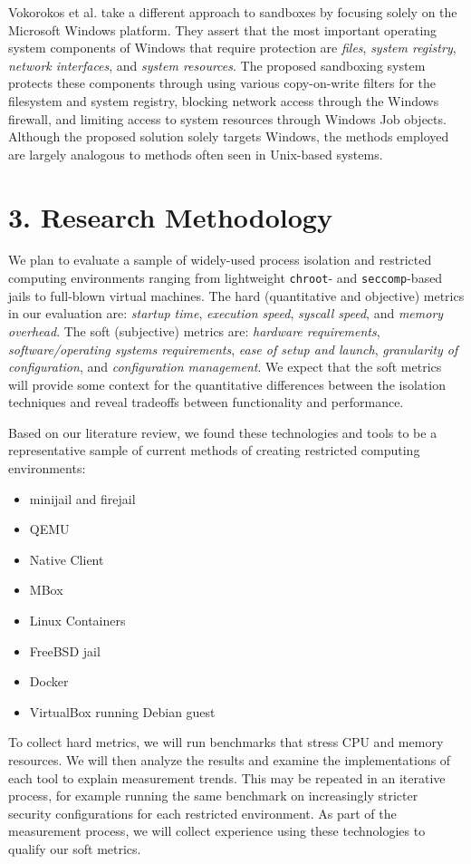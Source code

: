 \documentclass{proc}
\begin{document}
Vokorokos et al. \cite{vokorokos2015sandboxMSWIN} take a different approach to sandboxes by focusing solely on the Microsoft Windows platform. They assert that the most important operating system components of Windows that require protection are \textit{files}, \textit{system registry}, \textit{network interfaces}, and \textit{system resources}. The proposed sandboxing system protects these components through using various copy-on-write filters for the filesystem and system registry, blocking network access through the Windows firewall, and limiting access to system resources through Windows Job objects. Although the proposed solution solely targets Windows, the methods employed are largely analogous to methods often seen in Unix-based systems.

\section*{3. Research Methodology}
We plan to evaluate a sample of widely-used process isolation and restricted computing environments ranging from lightweight \texttt{chroot}- and \texttt{seccomp}-based jails to full-blown virtual machines. The hard (quantitative and objective) metrics in our evaluation are: \textit{startup time}, \textit{execution speed}, \textit{syscall speed}, and \textit{memory overhead}. The soft (subjective) metrics are: \textit{hardware requirements}, \textit{software/operating systems requirements}, \textit{ease of setup and launch}, \textit{granularity of configuration}, and \textit{configuration management}. We expect that the soft metrics will provide some context for the quantitative differences between the isolation techniques and reveal tradeoffs between functionality and performance.

Based on our literature review, we found these technologies and tools to be a representative sample of current methods of creating restricted computing environments:\vspace{0.5em}
{\small
\begin{itemize}
\item minijail and firejail
\item QEMU
\item Native Client
\item MBox
\item Linux Containers
\item FreeBSD jail
\item Docker
\item VirtualBox running Debian guest
\end{itemize}
}
To collect hard metrics, we will run benchmarks that stress CPU and memory resources. We will then analyze the results and examine the implementations of each tool to explain measurement trends. This may be repeated in an iterative process, for example running the same benchmark on increasingly stricter security configurations for each restricted environment. As part of the measurement process, we will collect experience using these technologies to qualify our soft metrics.
\end{document}

